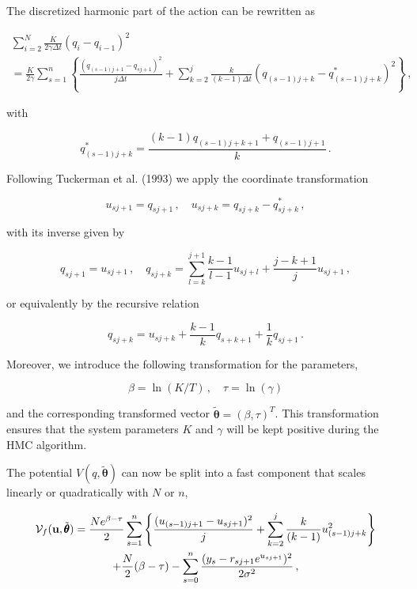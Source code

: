 \documentclass[11pt, a4paper]{article}
\newcommand{\vc}[1]{{\bf #1 }}
\newcommand{\bt}{\pmb\theta}
\begin{document}
The discretized harmonic part of the action can be rewritten as

\begin{multline}
  \sum_{i=2}^{N}
  \frac{K}{2\gamma\Delta t}
  (q_i-q_{i-1})^2
  \\ =
  \frac{K}{2\gamma}
  \sum_{s=1}^{n}\left\{
    \frac{(q_{(s-1)j+1} - q_{sj+1})^2}{j\Delta t}
    +
    \sum_{k=2}^j
    \frac{k}{(k-1)\Delta t}
    (q_{(s-1)j+k}-q^*_{(s-1)j+k})^2
  \right\}\,,
\end{multline}

with

\begin{equation}
  q^*_{(s-1)j+k}
  =
  \frac{(k-1)q_{(s-1)j+k+1} + q_{(s-1)j+1} }{k}
  \,.
\end{equation}

Following Tuckerman et al. (1993) we apply the coordinate transformation

\begin{equation}
  u_{sj+1} = q_{sj+1}\,,\quad
  u_{sj+k} = q_{sj+k} - q^*_{sj+k}\,,
\end{equation}

with its inverse given by

\begin{equation}
  q_{sj+1} = u_{sj+1}\,,\quad
  q_{sj+k} = \sum_{l=k}^{j+1}\frac{k-1}{l-1}u_{sj+l}
  +\frac{j-k+1}{j}u_{sj+1}\,,
\end{equation}

or equivalently by the recursive relation

\begin{equation}
  q_{sj+k} = u_{sj+k} + \frac{k-1}{k} q_{s+k+1}+ \frac{1}{k}q_{sj+1} \,.
\end{equation}

Moreover, we introduce the following transformation for the parameters,

\begin{equation}\label{params_transform}
\beta = \ln(K/T) \,,\quad \tau=\ln(\gamma)
\end{equation}

and the corresponding transformed vector $\tilde{\bt}=(\beta,\tau)^T$. This transformation ensures that the system parameters $K$ and $\gamma$ will be kept positive during the HMC algorithm.

The potential $V(q,\tilde{\bt})$ can now be split into a fast component that scales linearly or quadratically with $N$ or $n$,

\begin{multline}
  {\mathcal V}_f(\vc u,\tilde{\bt})
  =
  \frac{N e^{\beta-\tau}}{2}
  \sum_{s=1}^n\left\{
    \frac{(u_{(s-1)j+1} - u_{sj+1})^2}{j}
    +
    \sum_{k=2}^j
    \frac{k}{(k-1)}
    u_{(s-1)j+k}^2
  \right\}
  \\
  +
  \frac{N}{2}(\beta-\tau)
      -
    \sum_{s=0}^{n}
    \frac
    {(y_s-r_{sj+1}e^{u_{sj+1}})^2}
    {2 \sigma^2}
  \,,
\end{multline}
\end{document}
